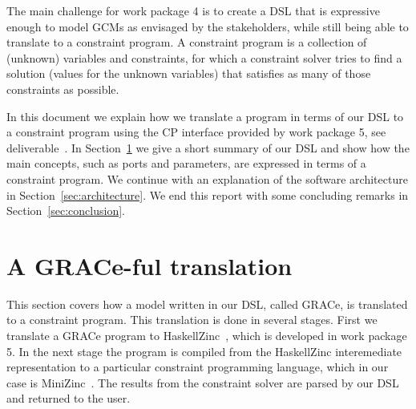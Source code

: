 \documentclass{article}
\begin{document}
The main challenge for work package 4 is to create a \ac{DSL} that is expressive
enough to model \acp{GCM} as envisaged by the stakeholders, while still being
able to translate to a constraint program. A constraint program is a
collection of (unknown) variables and constraints, for which a constraint solver
tries to find a solution (values for the unknown variables) that satisfies as
many of those constraints as possible. 

In this document we explain how we translate a program in terms of our \ac{DSL} 
to a constraint program using the \ac{CP} interface provided by work package 5, 
see deliverable~\cite{}. In Section~\ref{sec:translate} we give a short summary
of our \ac{DSL} and show how the main concepts, such as ports and parameters,
are expressed in terms of a constraint program. We continue with an explanation
of the software architecture in Section~\ref{sec:architecture}. We end this 
report with some concluding remarks in Section~\ref{sec:conclusion}.


\section{A GRACe-ful translation}
\label{sec:translate}

This section covers how a model written in our DSL, called GRACe, is translated
to a constraint program. This translation is done in several stages. First we
translate a GRACe program to HaskellZinc~\cite{}, which is developed in work
package 5. In the next stage the program is compiled from the HaskellZinc
interemediate representation to a particular constraint programming language,
which in our case is MiniZinc~\cite{MiniZinc}. The results from the constraint
solver are parsed by our \ac{DSL} and returned to the user. 
\end{document}
